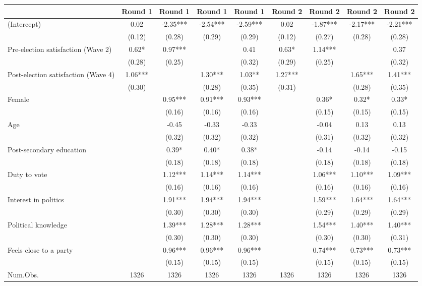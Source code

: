 \begin{table}
\centering
\begin{tabular}[t]{lcccccccc}
\toprule
  & Round 1 & Round 1  & Round 1   & Round 1    & Round 2 & Round 2  & Round 2   & Round 2   \\
\midrule
(Intercept) & 0.02 & -2.35*** & -2.54*** & -2.59*** & 0.02 & -1.87*** & -2.17*** & -2.21***\\
 & (0.12) & (0.28) & (0.29) & (0.29) & (0.12) & (0.27) & (0.28) & (0.28)\\
Pre-election satisfaction (Wave 2) & 0.62* & 0.97*** &  & 0.41 & 0.63* & 1.14*** &  & 0.37\\
 & (0.28) & (0.25) &  & (0.32) & (0.29) & (0.25) &  & (0.32)\\
Post-election satisfaction (Wave 4) & 1.06*** &  & 1.30*** & 1.03** & 1.27*** &  & 1.65*** & 1.41***\\
 & (0.30) &  & (0.28) & (0.35) & (0.31) &  & (0.28) & (0.35)\\
Female &  & 0.95*** & 0.91*** & 0.93*** &  & 0.36* & 0.32* & 0.33*\\
 &  & (0.16) & (0.16) & (0.16) &  & (0.15) & (0.15) & (0.15)\\
Age &  & -0.45 & -0.33 & -0.33 &  & -0.04 & 0.13 & 0.13\\
 &  & (0.32) & (0.32) & (0.32) &  & (0.31) & (0.32) & (0.32)\\
Post-secondary education &  & 0.39* & 0.40* & 0.38* &  & -0.14 & -0.14 & -0.15\\
 &  & (0.18) & (0.18) & (0.18) &  & (0.18) & (0.18) & (0.18)\\
Duty to vote &  & 1.12*** & 1.14*** & 1.14*** &  & 1.06*** & 1.10*** & 1.09***\\
 &  & (0.16) & (0.16) & (0.16) &  & (0.16) & (0.16) & (0.16)\\
Interest in politics &  & 1.91*** & 1.94*** & 1.94*** &  & 1.59*** & 1.64*** & 1.64***\\
 &  & (0.30) & (0.30) & (0.30) &  & (0.29) & (0.29) & (0.29)\\
Political knowledge &  & 1.39*** & 1.28*** & 1.28*** &  & 1.54*** & 1.40*** & 1.40***\\
 &  & (0.30) & (0.30) & (0.30) &  & (0.30) & (0.30) & (0.31)\\
Feels close to a party &  & 0.96*** & 0.96*** & 0.96*** &  & 0.74*** & 0.73*** & 0.73***\\
 &  & (0.15) & (0.15) & (0.15) &  & (0.15) & (0.15) & (0.15)\\
\midrule
Num.Obs. & 1326 & 1326 & 1326 & 1326 & 1326 & 1326 & 1326 & 1326\\

\end{tabular}
\end{table}
